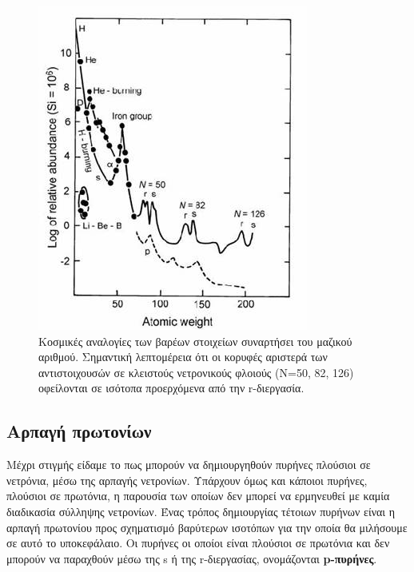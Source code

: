 \begin{figure}
    \centering
    \includegraphics[scale=0.7]{Figures/abundance.jpg}
    \caption{Κοσμικές αναλογίες των βαρέων στοιχείων συναρτήσει του μαζικού αριθμού. Σημαντική λεπτομέρεια ότι οι κορυφές αριστερά των αντιστοιχουσών σε κλειστούς νετρονικούς φλοιούς (Ν=50, 82, 126) οφείλονται σε ισότοπα προερχόμενα από την r-διεργασία.}
    \label{fig:apx:cosmic_abundances}
\end{figure}
\subsection{Αρπαγή πρωτονίων}
Μέχρι στιγμής είδαμε το πως μπορούν να δημιουργηθούν πυρήνες πλούσιοι σε νετρόνια, μέσω της αρπαγής νετρονίων. Υπάρχουν όμως και κάποιοι πυρήνες, πλούσιοι σε πρωτόνια, η παρουσία των οποίων δεν μπορεί να ερμηνευθεί με καμία διαδικασία σύλληψης νετρονίων. Ένας τρόπος δημιουργίας τέτοιων πυρήνων είναι η αρπαγή πρωτονίου προς σχηματισμό βαρύτερων ισοτόπων για την οποία θα μιλήσουμε σε αυτό το υποκεφάλαιο. Οι πυρήνες οι οποίοι είναι πλούσιοι σε πρωτόνια και δεν μπορούν να παραχθούν μέσω της s ή της r-διεργασίας, ονομάζονται \textbf{p-πυρήνες}.
